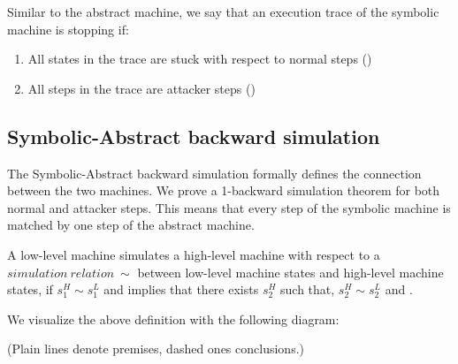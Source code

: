 Similar to the abstract machine, we say that an execution trace of the
symbolic machine is stopping if:
\begin{enumerate}
\item All states in the trace are stuck with respect to normal steps
  (\stepn{}{})
\item All steps in the trace are attacker steps (\stepa{}{}{})
\end{enumerate}

\subsection{Symbolic-Abstract backward simulation}
\label{sec:refinement_SA}

The Symbolic-Abstract backward simulation formally defines the
connection between the two machines. We prove a
1-backward simulation theorem for
both normal and attacker steps. This means that every
step of the symbolic machine is matched by one step
of the abstract machine.

\begin{definition}
\label{simulation_LH}
  A low-level machine simulates a high-level machine with respect to a
  $simulation~relation~\sim$ between low-level machine states and
  high-level machine states, if $s^H_1 \sim s_1^L$ and
   implies that there exists $s^H_2$ such that,
  $s^H_2 \sim s^L_2$ and .

We visualize the above definition with the following diagram:

%
\vspace{-\smallskipamount}
 \begin{center}
  \end{center}
\vspace{-\smallskipamount}
(Plain lines denote premises, dashed ones conclusions.)
\end{definition}

